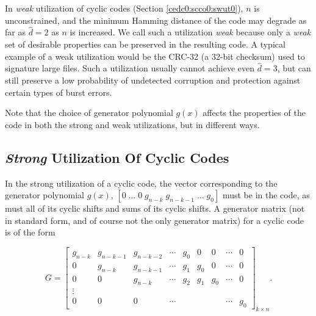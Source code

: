 In \emph{weak} utilization of cyclic codes
(Section \ref{cedc0:scco0:swut0}), $n$ is unconstrained, and the minimum Hamming
distance of the code may degrade as far as $\hat{d}=2$ as $n$ is
increased.  We call such a utilization
\emph{weak} because only a \emph{weak} set of desirable properties can be preserved
in the resulting code.  A typical example of a weak utilization would be the CRC-32 (a
32-bit checksum) used to signature large files.  Such a utilization usually cannot
achieve even $\hat{d} = 3$, but can still preserve a low probability of undetected corruption
and protection against certain types of burst errors.

Note that the choice of generator polynomial $g(x)$ 
affects the properties of the code in both
the strong and weak utilizations, but in different ways.


\subsection{\emph{Strong} Utilization Of Cyclic Codes}
\label{cedc0:scco0:ssut0}

In the strong utilization of a cyclic code,
the vector corresponding to the generator polynomial $g(x)$, 
$[0 \; \ldots \; 0 \; g_{n-k} \; g_{n-k-1} \; \ldots \; g_{0}]$ must 
be in the code, as must all of its cyclic shifts and sums of its
cyclic shifts.  A generator
matrix (not in standard form, and of course not the only generator 
matrix) for a cyclic code is of the form

\begin{equation}
\label{eq:cedc0:scco0:ssut0:02}
G = \left[
    \begin{array}{lllllllll}
    g_{n-k}  & g_{n-k-1}  & g_{n-k-2} &  \cdots  & g_{0}     &  0         &       0    &  \cdots{}  &   0 \\
    0        & g_{n-k}    & g_{n-k-1} &  \cdots  & g_{1}     &  g_{0}     &       0    &  \cdots{}  &   0 \\
    0        &   0        & g_{n-k}   &  \cdots  & g_{2}     &  g_{1}     &   g_{0}    &  \cdots{}  &   0 \\
    \vdots{} &            &           &          &           &            &            &            &     \\
    0        &   0        &   0       &  \cdots  &           &            &            &  \cdots{}  &   g_{0}   
    \end{array}
    \right]_{k \times n} \!\!\!\!\!\!\!\!\!\!.
\end{equation}

